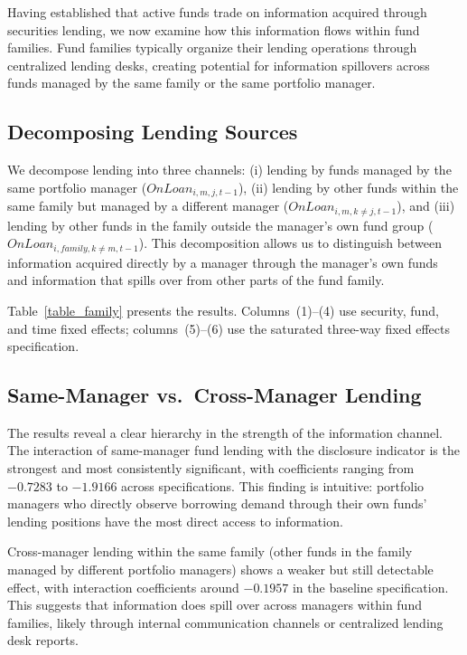 
Having established that active funds trade on information acquired through securities lending, we now examine how this information flows within fund families. Fund families typically organize their lending operations through centralized lending desks, creating potential for information spillovers across funds managed by the same family or the same portfolio manager.

\subsection{Decomposing Lending Sources}

We decompose lending into three channels: (i) lending by funds managed by the same portfolio manager ($OnLoan_{i,m,j,t-1}$), (ii) lending by other funds within the same family but managed by a different manager ($OnLoan_{i,m,k\neq j,t-1}$), and (iii) lending by other funds in the family outside the manager's own fund group ($OnLoan_{i,family,k\neq m,t-1}$). This decomposition allows us to distinguish between information acquired directly by a manager through the manager's own funds and information that spills over from other parts of the fund family.

Table~\ref{table_family} presents the results. Columns~(1)--(4) use security, fund, and time fixed effects; columns~(5)--(6) use the saturated three-way fixed effects specification.

\subsection{Same-Manager vs.\ Cross-Manager Lending}

The results reveal a clear hierarchy in the strength of the information channel. The interaction of same-manager fund lending with the disclosure indicator is the strongest and most consistently significant, with coefficients ranging from $-0.7283$ to $-1.9166$ across specifications. This finding is intuitive: portfolio managers who directly observe borrowing demand through their own funds' lending positions have the most direct access to information.

Cross-manager lending within the same family (other funds in the family managed by different portfolio managers) shows a weaker but still detectable effect, with interaction coefficients around $-0.1957$ in the baseline specification. This suggests that information does spill over across managers within fund families, likely through internal communication channels or centralized lending desk reports.

